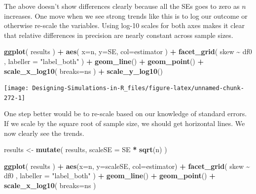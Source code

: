 \documentclass[
]{book}
\newenvironment{Shaded}{\begin{snugshade}}{\end{snugshade}}
\newcommand{\AttributeTok}[1]{\textcolor[rgb]{0.13,0.29,0.53}{#1}}
\newcommand{\FunctionTok}[1]{\textcolor[rgb]{0.13,0.29,0.53}{\textbf{#1}}}
\newcommand{\NormalTok}[1]{#1}
\newcommand{\OtherTok}[1]{\textcolor[rgb]{0.56,0.35,0.01}{#1}}
\newcommand{\SpecialCharTok}[1]{\textcolor[rgb]{0.81,0.36,0.00}{\textbf{#1}}}
\newcommand{\StringTok}[1]{\textcolor[rgb]{0.31,0.60,0.02}{#1}}
\begin{document}
The above doesn't show differences clearly because all the SEs goes to zero as \(n\) increases.
One move when we see strong trends like this is to log our outcome or otherwise re-scale the variables.
Using log-10 scales for both axes makes it clear that relative differences in precision are nearly constant across sample sizes.

\begin{Shaded}
\begin{Highlighting}[]
\FunctionTok{ggplot}\NormalTok{( results ) }\SpecialCharTok{+}
  \FunctionTok{aes}\NormalTok{( }\AttributeTok{x=}\NormalTok{n, }\AttributeTok{y=}\NormalTok{SE, }\AttributeTok{col=}\NormalTok{estimator ) }\SpecialCharTok{+}
  \FunctionTok{facet\_grid}\NormalTok{( skew }\SpecialCharTok{\textasciitilde{}}\NormalTok{ df0 , }\AttributeTok{labeller =} \StringTok{"label\_both"}\NormalTok{ ) }\SpecialCharTok{+}
  \FunctionTok{geom\_line}\NormalTok{() }\SpecialCharTok{+} \FunctionTok{geom\_point}\NormalTok{() }\SpecialCharTok{+}
  \FunctionTok{scale\_x\_log10}\NormalTok{( }\AttributeTok{breaks=}\NormalTok{ns ) }\SpecialCharTok{+}
  \FunctionTok{scale\_y\_log10}\NormalTok{()}
\end{Highlighting}
\end{Shaded}

\begin{center}\texttt{[image: Designing-Simulations-in-R\_files/figure-latex/unnamed-chunk-272-1]} \end{center}

One step better would be to re-scale based on our knowledge of standard errors.
If we scale by the square root of sample size, we should get horizontal lines.
We now clearly see the trends.

\begin{Shaded}
\begin{Highlighting}[]
\NormalTok{results }\OtherTok{\textless{}{-}} \FunctionTok{mutate}\NormalTok{( results, }\AttributeTok{scaleSE =}\NormalTok{ SE }\SpecialCharTok{*} \FunctionTok{sqrt}\NormalTok{(n) )}
\end{Highlighting}
\end{Shaded}

\begin{Shaded}
\begin{Highlighting}[]
\FunctionTok{ggplot}\NormalTok{( results ) }\SpecialCharTok{+}  
  \FunctionTok{aes}\NormalTok{(}\AttributeTok{x=}\NormalTok{n, }\AttributeTok{y=}\NormalTok{scaleSE, }\AttributeTok{col=}\NormalTok{estimator) }\SpecialCharTok{+}
  \FunctionTok{facet\_grid}\NormalTok{( skew }\SpecialCharTok{\textasciitilde{}}\NormalTok{ df0 , }\AttributeTok{labeller =} \StringTok{"label\_both"}\NormalTok{ ) }\SpecialCharTok{+}
  \FunctionTok{geom\_line}\NormalTok{() }\SpecialCharTok{+} \FunctionTok{geom\_point}\NormalTok{() }\SpecialCharTok{+}
  \FunctionTok{scale\_x\_log10}\NormalTok{( }\AttributeTok{breaks=}\NormalTok{ns )}
\end{Highlighting}
\end{Shaded}
\end{document}
